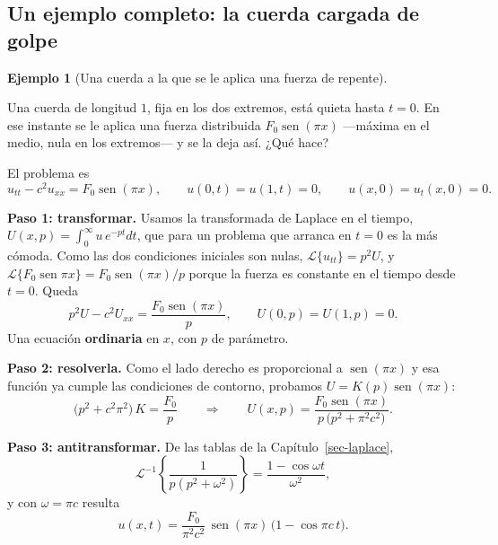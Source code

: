 \documentclass[
  spanish,
  a4paper,
]{scrbook}
\theoremstyle{definition}
\theoremstyle{plain}
\theoremstyle{definition}
\newtheorem{example}{Ejemplo}[chapter]
\theoremstyle{plain}
\theoremstyle{definition}
\theoremstyle{remark}
\begin{document}
\subsection{Un ejemplo completo: la cuerda cargada de
golpe}\label{sec-ejemplo-transformada}

\begin{example}[Una cuerda a la que se le aplica una fuerza de
repente]\protect\hypertarget{exm-cuerda-forzada}{}\label{exm-cuerda-forzada}

Una cuerda de longitud \(1\), fija en los dos extremos, está quieta
hasta \(t=0\). En ese instante se le aplica una fuerza distribuida
\(F_0\operatorname{sen}(\pi x)\) ---máxima en el medio, nula en los
extremos--- y se la deja así. ¿Qué hace?

El problema es \[
u_{tt} - c^2u_{xx} = F_0\operatorname{sen}(\pi x), \qquad
u(0,t)=u(1,t)=0, \qquad u(x,0)=u_t(x,0)=0 .
\]

\textbf{Paso 1: transformar.} Usamos la transformada de Laplace en el
tiempo, \(U(x,p) = \int_0^\infty u\,e^{-pt}dt\), que para un problema
que arranca en \(t=0\) es la más cómoda. Como las dos condiciones
iniciales son nulas, \(\mathcal{L}\{u_{tt}\} = p^2U\), y
\(\mathcal{L}\{F_0\operatorname{sen}\pi x\} = F_0\operatorname{sen}(\pi x)/p\)
porque la fuerza es constante en el tiempo desde \(t=0\). Queda \[
p^2 U - c^2 U_{xx} = \frac{F_0\operatorname{sen}(\pi x)}{p} ,
\qquad U(0,p)=U(1,p)=0 .
\] Una ecuación \textbf{ordinaria} en \(x\), con \(p\) de parámetro.

\textbf{Paso 2: resolverla.} Como el lado derecho es proporcional a
\(\operatorname{sen}(\pi x)\) y esa función ya cumple las condiciones de
contorno, probamos \(U = K(p)\operatorname{sen}(\pi x)\): \[
\big(p^2 + c^2\pi^2\big)\,K = \frac{F_0}{p}
\qquad\Longrightarrow\qquad
U(x,p) = \frac{F_0\operatorname{sen}(\pi x)}{p\,\big(p^2+\pi^2c^2\big)} .
\]

\textbf{Paso 3: antitransformar.} De las tablas de la
Capítulo~\ref{sec-laplace},
\[\mathcal{L}^{-1}\left\{\frac{1}{p(p^2+\omega^2)}\right\} = \frac{1-\cos\omega t}{\omega^2},\]
y con \(\omega = \pi c\) resulta \[
\boxed{\;u(x,t) = \frac{F_0}{\pi^2c^2}\,\operatorname{sen}(\pi x)\,\big(1 - \cos \pi c\,t\big).\;}
\]

\end{example}
\end{document}
